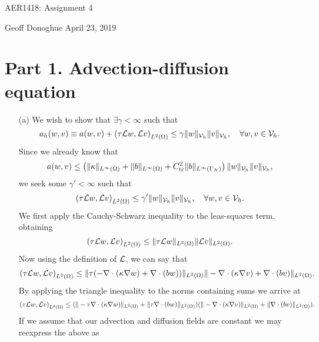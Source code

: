 \documentclass{article}
\begin{document}
\Large\centering AER1418: Assignment 4\\
\normalsize\raggedright Geoff Donoghue \hfill April 23, 2019\\

\section*{Part 1. Advection-diffusion equation}
\begin{itemize}
	\item[(a)] We wish to show that \(\exists\gamma < \infty \) such that
	\begin{equation*}
		a_h(w,v) \equiv a(w,v) + \left(\tau\mathcal{L} w, \mathcal{L} v \right)_{L^2(\Omega)} \leq \gamma\|w\|_{\mathcal{V}_h}\|v\|_{\mathcal{V}_h}, \quad \forall w,v\in \mathcal{V}_h.
	\end{equation*}
	Since we already know that
	\begin{equation*}
		a(w,v) \leq \left(\|\kappa\|_{L^\infty(\Omega)} + \|b\|_{L^\infty(\Omega)} + C^2_\text{tr}\|b\|_{L^\infty(\Gamma_N)} \right)\|w\|_{\mathcal{V}_h}\|v\|_{\mathcal{V}_h},
	\end{equation*}
	we seek some \(\gamma' < \infty \) such that
	\begin{equation*}
		\left(\tau\mathcal{L} w, \mathcal{L} v \right)_{L^2(\Omega)} \leq \gamma'\|w\|_{\mathcal{V}_h}\|v\|_{\mathcal{V}_h}, \quad \forall w,v\in \mathcal{V}_h.
	\end{equation*}
	We first apply the Cauchy-Schwarz inequality to the leas-squares term, obtaining
	\begin{equation*}
		\left(\tau\mathcal{L} w, \mathcal{L} v \right)_{L^2(\Omega)} \leq \|\tau\mathcal{L} w\|_{L^2(\Omega)}\|\mathcal{L} v\|_{L^2(\Omega)}.
	\end{equation*}
	Now using the definition of \(\mathcal{L} \), we can say that
	\begin{equation*}
		\left(\tau\mathcal{L} w, \mathcal{L} v \right)_{L^2(\Omega)} \leq \|\tau(-\nabla\cdot(\kappa\nabla w) + \nabla\cdot(bw))\|_{L^2(\Omega)}\|-\nabla\cdot(\kappa\nabla v) + \nabla\cdot(bv)\|_{L^2(\Omega)}.
	\end{equation*}
	By applying the triangle inequality to the norms containing sums we arrive at
	\begin{equation*}
		\left(\tau\mathcal{L} w, \mathcal{L} v \right)_{L^2(\Omega)} \leq (\|-\tau\nabla\cdot(\kappa\nabla w)\|_{L^2(\Omega)} + \|\tau\nabla\cdot(bw)\|_{L^2(\Omega)})(\|-\nabla\cdot(\kappa\nabla v)\|_{L^2(\Omega)} + \|\nabla\cdot(bv)\|_{L^2(\Omega)}).
	\end{equation*}
	If we assume that our advection and diffusion fields are constant we may reexpress the above as

\end{itemize}
\end{document}
